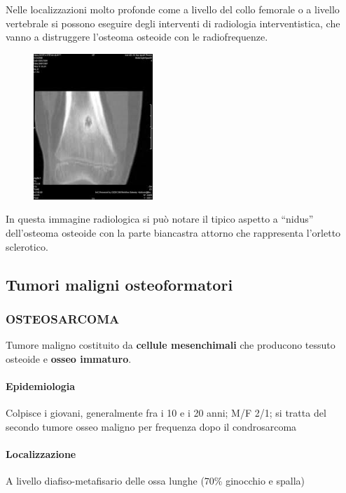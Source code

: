 Nelle localizzazioni molto profonde come a livello del collo femorale o a livello vertebrale si possono eseguire degli interventi di radiologia interventistica, che vanno a distruggere l'osteoma osteoide con le radiofrequenze.

\begin{figure}[!ht]
\centering
\includegraphics[width=0.4\textwidth]{010/image1.jpeg}
\end{figure}

In questa immagine radiologica si può notare il tipico aspetto a ``nidus'' dell'osteoma osteoide con la parte biancastra attorno che rappresenta l'orletto sclerotico.

\subsection{Tumori maligni osteoformatori}

\subsubsection{OSTEOSARCOMA}

Tumore maligno costituito da \textbf{cellule mesenchimali} che producono tessuto osteoide e \textbf{osseo immaturo}.

\paragraph{Epidemiologia}
Colpisce i giovani, generalmente fra i 10 e i 20 anni; M/F 2/1; si tratta del secondo tumore osseo maligno per frequenza dopo il condrosarcoma

\paragraph{Localizzazione}
A livello diafiso-metafisario delle ossa lunghe (70\% ginocchio e spalla)


